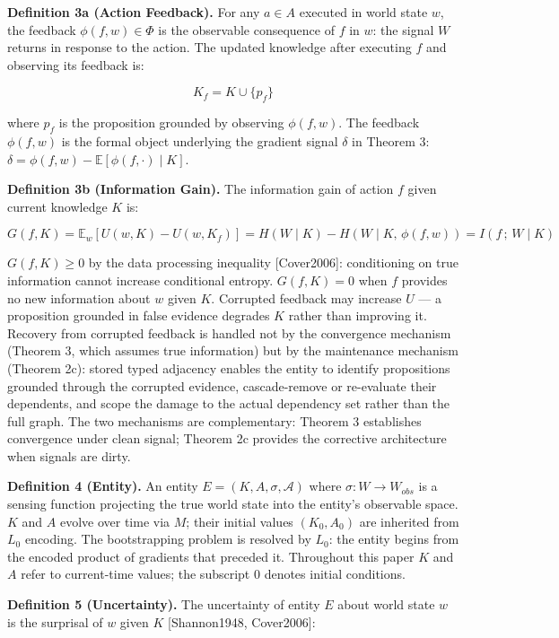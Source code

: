 \documentclass[
]{article}
\begin{document}
\textbf{Definition 3a (Action Feedback).} For any \(a \in A\) executed
in world state \(w\), the feedback \(\phi(f, w) \in \Phi\) is the
observable consequence of \(f\) in \(w\): the signal \(W\) returns in
response to the action. The updated knowledge after executing \(f\) and
observing its feedback is:

\[K_f = K \cup \{p_f\}\]

where \(p_f\) is the proposition grounded by observing \(\phi(f, w)\).
The feedback \(\phi(f,w)\) is the formal object underlying the gradient
signal \(\delta\) in Theorem 3: \(\delta =
\phi(f, w) - \mathbb{E}[\phi(f, \cdot) \mid K]\).

\textbf{Definition 3b (Information Gain).} The information gain of
action \(f\) given current knowledge \(K\) is:

\[G(f, K) = \mathbb{E}_w\!\left[U(w, K) - U(w, K_f)\right] = H(W \mid K) - H(W \mid K,\, \phi(f, w)) = I(f\,;\, W \mid K)\]

\(G(f, K) \geq 0\) by the data processing inequality
{[}Cover2006{]}: conditioning on true information cannot increase
conditional entropy. \(G(f, K) = 0\) when \(f\) provides no new
information about \(w\) given \(K\). Corrupted feedback may increase \(U\) --- a proposition grounded in
false evidence degrades \(K\) rather than improving it. Recovery from
corrupted feedback is handled not by the convergence mechanism (Theorem
3, which assumes true information) but by the maintenance mechanism
(Theorem 2c): stored typed adjacency enables the entity to identify
propositions grounded through the corrupted evidence, cascade-remove or
re-evaluate their dependents, and scope the damage to the actual
dependency set rather than the full graph. The two mechanisms are
complementary: Theorem 3 establishes convergence under clean signal;
Theorem 2c provides the corrective architecture when signals are dirty.

\textbf{Definition 4 (Entity).} An entity
\(E = (K, A, \sigma, \mathcal{A})\) where
\(\sigma : W \rightarrow W_{obs}\) is a sensing function projecting the
true world state into the entity's observable space. \(K\) and \(A\)
evolve over time via \(M\); their initial values \((K_0, A_0)\) are
inherited from \(L_0\) encoding. The bootstrapping problem is resolved
by \(L_0\): the entity begins from the encoded product of gradients that
preceded it. Throughout this paper \(K\) and \(A\) refer to
current-time values; the subscript \(0\) denotes initial conditions.

\textbf{Definition 5 (Uncertainty).} The uncertainty of entity \(E\)
about world state \(w\) is the surprisal of \(w\) given \(K\)
{[}Shannon1948, Cover2006{]}:
\end{document}
